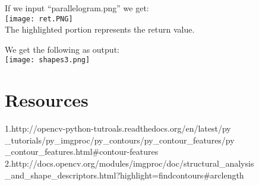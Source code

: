 \documentclass[]{article}
\begin{document}
If we input ``parallelogram.png'' we get:\\
\texttt{[image: ret.PNG]}\\
The highlighted portion represents the return value.

We get the following as output:\\
\texttt{[image: shapes3.png]}

\section{Resources}\label{resources}

1.http://opencv-python-tutroals.readthedocs.org/en/latest/py \\
\_tutorials/py\_imgproc/py\_contours/py\_contour\_features/py\\
\_contour\_features.html\#contour-features\\
2.http://docs.opencv.org/modules/imgproc/doc/structural\_analysis \\
\_and\_shape\_descriptors.html?highlight=findcontours\#arclength
\end{document}
